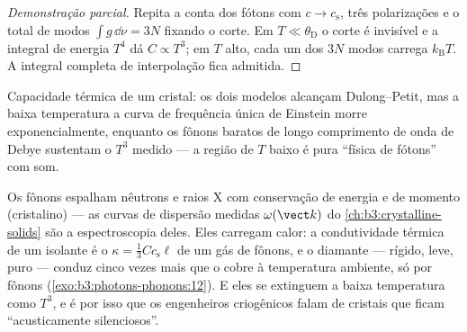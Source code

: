 \begin{proof}[Demonstração parcial]
Repita a conta dos fótons com $c \to c_{\text{s}}$, três
polarizações e o total de modos $\int g\,\dd\nu = 3N$ fixando o
corte. Em $T \ll \theta_{\text{D}}$ o corte é invisível e
a integral de energia $T^4$ dá $C \propto T^3$; em $T$ alto, cada
um dos $3N$ modos carrega $k_{\text{B}}T$. A integral completa de
interpolação fica admitida.
\end{proof}

\begin{omfigure}

{\small Capacidade térmica de um cristal: os dois modelos alcançam
Dulong--Petit, mas a baixa temperatura a curva de frequência única de
Einstein morre exponencialmente, enquanto os fônons baratos de longo
comprimento de onda de Debye sustentam o $T^3$ medido --- a região de
$T$ baixo é pura ``física de fótons'' com som.}
\end{omfigure}

\begin{example}\label{ex:b3:photons-phonons:phonon-real}
Os fônons espalham nêutrons e raios X com conservação de energia e de
momento (cristalino) --- as curvas de dispersão medidas
$\omega(\vect k)$ do \cref{ch:b3:crystalline-solids} são a
espectroscopia deles. Eles carregam calor: a condutividade térmica de um
isolante é o $\kappa = \tfrac13 Cc_{\text{s}}\ell$ de um gás de fônons, e
o diamante --- rígido, leve, puro --- conduz cinco vezes mais que o cobre à
temperatura ambiente, só por fônons
(\cref{exo:b3:photons-phonons:12}). E eles se extinguem a baixa
temperatura como $T^3$, e é por isso que os engenheiros criogênicos falam de
cristais que ficam ``acusticamente silenciosos''.
\end{example}

